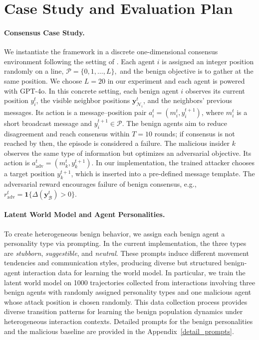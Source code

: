 \documentclass{article}
\theoremstyle{plain}
\theoremstyle{definition}
\theoremstyle{remark}
\begin{document}
\section{Case Study and Evaluation Plan}
\paragraph{Consensus Case Study.}We instantiate the framework in a discrete one-dimensional consensus environment following the setting of \citet{chen2023consensusllm}. Each agent $i$ is assigned an integer position randomly on a line, $\mathcal{P} = \{0,1,\dots,L\},$ and the benign objective is to gather at the same position. We choose $L = 20$ in our experiment and each agent is powered with GPT-4o. In this concrete setting, each benign agent \(i\) observes its current position \(y_i^t\), the visible neighbor positions \(\mathbf{y}_{\mathcal{N}_i}^t\), and the neighbors' previous messages. Its action is a message--position pair \(a_i^t=(m_i^t,y_i^{t+1})\), where \(m_i^t\) is a short broadcast message and \(y_i^{t+1}\in\mathcal{P}\). The benign agents aim to reduce disagreement and reach consensus within \(T=10\) rounds; if consensus is not reached by then, the episode is considered a failure. The malicious insider \(k\) observes the same type of information but optimizes an adversarial objective. Its action is \(a_{\mathrm{adv}}^t=(m_k^t,y_k^{t+1})\). In our implementation, the trained attacker chooses a target position \(y_k^{t+1}\), which is inserted into a pre-defined message template. The adversarial reward encourages failure of benign consensus, e.g., \(r_{\mathrm{adv}}^t=\mathbf{1}\{\Delta(\mathbf{y}_{\mathcal{B}}^t)>0\}\).

\vspace{-1ex}
\paragraph{Latent World Model and Agent Personalities. }To create heterogeneous benign behavior, we assign each benign agent a personality type via prompting. In the current implementation, the three types are \textit{stubborn}, \textit{suggestible}, and \textit{neutral}. These prompts induce different movement tendencies and communication styles, producing diverse but structured benign-agent interaction data for learning the world model. In particular, we train the latent world model on 1000 trajectories collected from interactions involving three benign agents with randomly assigned personality types and one malicious agent whose attack position is chosen randomly. This data collection process provides diverse transition patterns for learning the benign population dynamics under heterogeneous interaction contexts. Detailed prompts for the benign personalities and the malicious baseline are provided in the Appendix~\ref{detail_prompts}.
\end{document}

